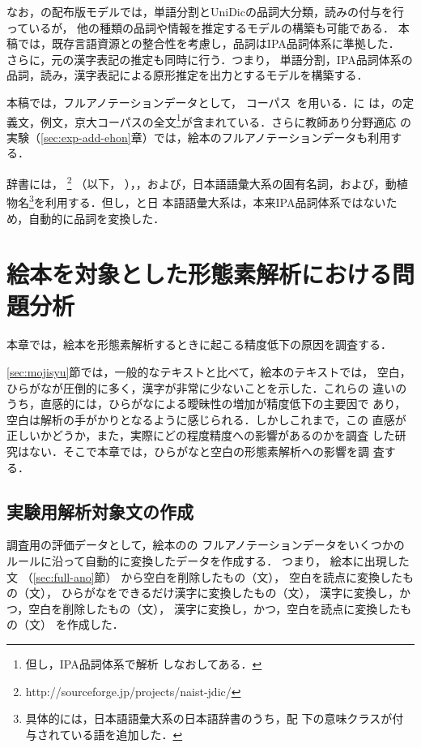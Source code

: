 \documentclass[japanese]{jnlp_1.4}
\newcommand{\kodomo}{}
\newcommand{\kytea}{}
\newcommand{\lxd}{}
\newcommand{\naistj}{}
\newcommand{\ntj}{}
\newcommand{\hinoki}{}
\newcommand{\refs}[1]{}
\newcommand{\izj}[1]{}
\begin{document}
なお，\kytea の配布版モデルでは，単語分割とUniDicの品詞大分類，読みの付与を行っているが，
他の種類の品詞や情報を推定するモデルの構築も可能である．
本稿では，既存言語資源との整合性を考慮し，品詞はIPA品詞体系に準拠した．
さらに，元の漢字表記の推定も同時に行う．つまり，
単語分割，IPA品詞体系の品詞，読み，漢字表記による原形推定を出力とするモデルを構築する．

本稿では，フルアノテーションデータとして，
コーパス\hinoki\ \cite{Bond:Fujita:Tanaka:2006}を用いる．\hinoki に
は，\lxd の定義文，例文，京大コーパスの全文\footnote{但し，IPA品詞体系で解析
しなおしてある．}が含まれている．さらに教師あり分野適応
の実験（\ref{sec:exp-add-ehon}章）では，絵本のフルアノテーションデータも利用する．

辞書には，
\naistj \footnote{http://sourceforge.jp/projects/naist-jdic/} （以下，
\ntj），\lxd，および，日本語語彙大系\cite{GoiTaikeij}の固有名詞，および，動植物名\footnote{
具体的には，日本語語彙大系の日本語辞書のうち，\izj{543:生物}配
下の意味クラスが付与されている語を追加した．}を利用する．但し，\lxd と日
本語語彙大系は，本来IPA品詞体系ではないため，自動的に品詞を変換した．


\section{絵本を対象とした形態素解析における問題分析}
\label{sec:bunseki}

本章では，絵本を形態素解析するときに起こる精度低下の原因を調査する．

\ref{sec:mojisyu}節では，一般的なテキストと比べて，絵本のテキストでは，
空白，ひらがなが圧倒的に多く，漢字が非常に少ないことを示した．これらの
違いのうち，直感的には，ひらがなによる曖昧性の増加が精度低下の主要因で
あり，空白は解析の手がかりとなるように感じられる．しかしこれまで，この
直感が正しいかどうか，また，実際にどの程度精度への影響があるのかを調査
した研究はない．そこで本章では，ひらがなと空白の形態素解析への影響を調
査する．


\subsection{実験用解析対象文の作成}
\label{sec:bunseki-bun}

調査用の評価データとして，絵本の\kodomo の
フルアノテーションデータをいくつかのルールに沿って自動的に変換したデータを作成する．
つまり，
絵本に出現した文\refs{eva-org} （\ref{sec:full-ano}節）
から空白を削除したもの（文\refs{eva-del}），
空白を読点に変換したもの（文\refs{eva-punc}），
ひらがなをできるだけ漢字に変換したもの（文\refs{eva-han}），
漢字に変換し，かつ，空白を削除したもの（文\refs{eva-handel}），
漢字に変換し，かつ，空白を読点に変換したもの（文\refs{eva-hanpunc}）
を作成した．
\end{document}
